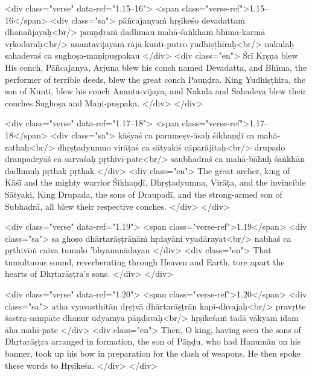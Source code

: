 \begin{html}
<div class="verse" data-ref="1.15–16">
  <span class="verse-ref">1.15–16</span>
  <div class="sa">
    pāñcajanyaṁ hṛṣīkeśo devadattaṁ dhanañjayaḥ<br/>
    pauṇḍraṁ dadhmau mahā-śaṅkhaṁ bhīma-karmā vṛkodaraḥ<br/>
    anantavijayaṁ rājā kuntī-putro yudhiṣṭhiraḥ<br/>
    nakulaḥ sahadevaś ca sughoṣa-maṇipuṣpakau
  </div>
  <div class="en">
    Śrī Kṛṣṇa blew His conch, Pāñcajanya, Arjuna blew his conch named Devadatta, and Bhīma, the performer of terrible deeds, blew the great conch Pauṇḍra. King Yudhiṣṭhira, the son of Kuntī, blew his conch Ananta-vijaya, and Nakula and Sahadeva blew their conches Sughoṣa and Maṇi-puṣpaka.
  </div>
</div>
\end{html}



\begin{html}
<div class="verse" data-ref="1.17–18">
  <span class="verse-ref">1.17–18</span>
  <div class="sa">
    kāśyaś ca parameṣv-āsaḥ śikhaṇḍī ca mahā-rathaḥ<br/>
    dhṛṣṭadyumno virāṭaś ca sātyakiś cāparājitaḥ<br/>
    drupado draupadeyāś ca sarvaśaḥ pṛthivī-pate<br/>
    saubhadraś ca mahā-bāhuḥ śaṅkhān dadhmuḥ pṛthak pṛthak
  </div>
  <div class="en">
    The great archer, king of Kāśī and the mighty warrior Śikhaṇḍī, Dhṛṣṭadyumna, Virāṭa, and the invincible Sātyaki, King Drupada, the sons of Draupadī, and the strong-armed son of Subhadrā, all blew their respective conches.
  </div>
</div>
\end{html}



\begin{html}
<div class="verse" data-ref="1.19">
  <span class="verse-ref">1.19</span>
  <div class="sa">
    sa ghoṣo dhārtarāṣṭrāṇāṁ hṛdayāni vyadārayat<br/>
    nabhaś ca pṛthivīṁ caiva tumulo ’bhyanunādayan
  </div>
  <div class="en">
    That tumultuous sound, reverberating through Heaven and Earth, tore apart the hearts of Dhṛtarāṣṭra’s sons.
  </div>
</div>
\end{html}



\begin{html}
<div class="verse" data-ref="1.20">
  <span class="verse-ref">1.20</span>
  <div class="sa">
    atha vyavasthitān dṛṣṭvā dhārtarāṣṭrān kapi-dhvajaḥ<br/>
    pravṛtte śastra-sampāte dhanur udyamya pāṇḍavaḥ<br/>
    hṛṣīkeśaṁ tadā vākyam idam āha mahī-pate
  </div>
  <div class="en">
    Then, O king, having seen the sons of Dhṛtarāṣṭra arranged in formation, the son of Pāṇḍu, who had Hanumān on his banner, took up his bow in preparation for the clash of weapons. He then spoke these words to Hṛṣīkeśa.
  </div>
</div>
\end{html}



